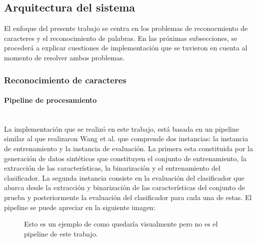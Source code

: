 \subsection{Arquitectura del sistema}
\label{subsection:impl_propia}

	El enfoque del presente trabajo se centra en los problemas de reconocmiento de caracteres y el reconocimiento de palabras. En las próximas subsecciones, se procederá a explicar cuestiones de implementación que se tuvieron en cuenta al momento de resolver ambos problemas.

	\subsubsection{Reconocimiento de caracteres}
	\label{subsubsection:recon-caracteres}
		\paragraph{Pipeline de procesamiento} ~\\

			La implementación que se realizó en este trabajo, está basada en un pipeline similar al que realizaron Wang et al. que comprende dos instancias: la instancia de entrenamiento y la instancia de evaluación. La primera esta constituida por la generación de datos sintéticos que constituyen el conjunto de entrenamiento, la extracción de las características, la binarización y el entrenamiento del clasificador. La segunda instancia consiste en la evaluación del clasificador que abarca desde la extracción y binarización de las características del conjunto de prueba y posteriormente la evaluación del clasificador para cada una de estas. El pipeline se puede apreciar en la siguiente imagen:

			\begin{figure}[htbp]
				\centering
				\caption[Pipeline de procesamiento]{Esto es un ejemplo de como quedaría visualmente pero no es el pipeline de este trabajo.}
				\label{fig: Pipeline de mi sistema}
			\end{figure}

